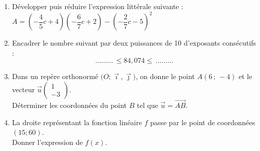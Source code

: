 \documentclass[a4paper,11pt]{article}
\begin{document}
\begin{seance}{} %

\begin{enumerate}
\item Développer puis réduire l'expression littérale suivante :\\
 $A=\left(-\dfrac{4}{5}c+4\right)\left(-\dfrac{6}{7}c+2\right)-\left(-\dfrac{2}{7}c-5\right)^2$ \dotfill

\bigskip

\dotfill

\bigskip

\item Encadrer le nombre suivant par deux puissances de 10 d'exposants consécutifs : 
 $$\dots\dots\dots\,\leqslant 84{,}074\leqslant\,\dots\dots\dots$$


\item  Dans un repère orthonormé $\big(O ; \vec \imath,\vec \jmath\big)$, on donne le point $A(6\,;\,-4)$ et le vecteur $\vec{u}\begin{pmatrix}1\\-3\end{pmatrix}$.\\Déterminer les coordonnées du point $B$ tel que $\overrightarrow{u}=\overrightarrow{AB}$. \dotfill

\bigskip

\dotfill

\bigskip

\dotfill

\item La droite représentant la fonction linéaire $f$ passe par le point de coordonnées $(15;60)$.\\Donner l'expression de  $f(x)$.\\\begin{center}
\begin{tikzpicture}[baseline,scale = 0.6]


\end{tikzpicture}
\end{center}
\end{enumerate}
\end{seance}
\end{document}
